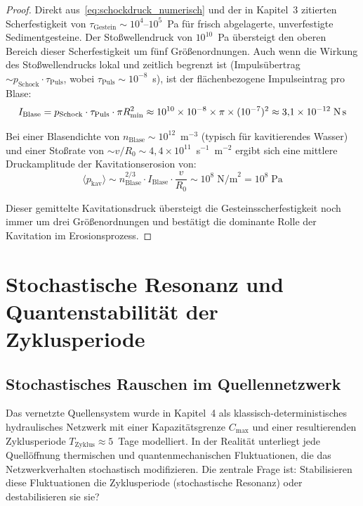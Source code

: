 ﻿\documentclass[12pt,a4paper]{report}
\begin{document}
\begin{proof}
	Direkt aus~\eqref{eq:schockdruck_numerisch} und der in Kapitel~3 zitierten Scherfestigkeit von $\tau_\mathrm{Gestein} \sim 10^4$--$10^5$~Pa für frisch abgelagerte, unverfestigte Sedimentgesteine. Der Stoßwellendruck von $10^{10}$~Pa übersteigt den oberen Bereich dieser Scherfestigkeit um fünf Größenordnungen. Auch wenn die Wirkung des Stoßwellendrucks lokal und zeitlich begrenzt ist (Impulsübertrag $\sim p_\mathrm{Schock}\cdot\tau_\mathrm{Puls}$, wobei $\tau_\mathrm{Puls} \sim 10^{-8}$~s), ist der flächenbezogene Impulseintrag pro Blase:
	\begin{equation}
		I_\mathrm{Blase} = p_\mathrm{Schock}\cdot\tau_\mathrm{Puls}\cdot\pi R_\mathrm{min}^2 \approx 10^{10}\times10^{-8}\times\pi\times(10^{-7})^2 \approx 3{,}1\times10^{-12}\;\text{N\,s}
		\label{eq:impuls_blase}
	\end{equation}
	
	Bei einer Blasendichte von $n_\mathrm{Blase} \sim 10^{12}$~m$^{-3}$ (typisch für kavitierendes Wasser) und einer Stoßrate von $\sim v/R_0 \sim 4{,}4\times10^{11}$~s$^{-1}$~m$^{-2}$ ergibt sich eine mittlere Druckamplitude der Kavitationserosion von:
	\begin{equation}
		\langle p_\mathrm{kav}\rangle \sim n_\mathrm{Blase}^{2/3}\cdot I_\mathrm{Blase}\cdot\frac{v}{R_0} \sim 10^8\;\text{N/m}^2 = 10^8\;\text{Pa}
		\label{eq:mittlerer_kavdruck}
	\end{equation}
	
	Dieser gemittelte Kavitationsdruck übersteigt die Gesteinsscherfestigkeit noch immer um drei Größenordnungen und bestätigt die dominante Rolle der Kavitation im Erosionsprozess.
\end{proof}

\section{Stochastische Resonanz und Quantenstabilität der Zyklusperiode}
\label{sec:stochastische_resonanz}

\subsection{Stochastisches Rauschen im Quellennetzwerk}

Das vernetzte Quellensystem wurde in Kapitel~4 als klassisch-deterministisches hydraulisches Netzwerk mit einer Kapazitätsgrenze $C_\mathrm{max}$ und einer resultierenden Zyklusperiode $T_\mathrm{Zyklus} \approx 5$~Tage modelliert. In der Realität unterliegt jede Quellöffnung thermischen und quantenmechanischen Fluktuationen, die das Netzwerkverhalten stochastisch modifizieren. Die zentrale Frage ist: Stabilisieren diese Fluktuationen die Zyklusperiode (stochastische Resonanz) oder destabilisieren sie sie?
\end{document}
